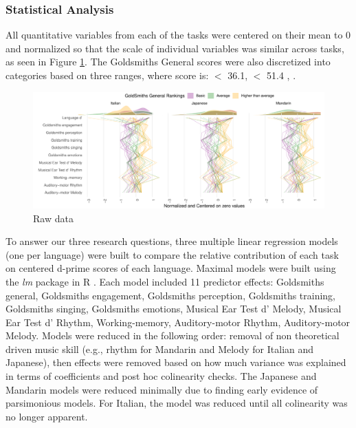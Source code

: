 \documentclass[a4paper]{article}
\begin{document}
\subsubsection{Statistical Analysis}


All quantitative variables from each of the tasks were centered on their mean to 0 and normalized so that the scale of individual variables was similar across tasks, as seen in Figure \ref{fig:centered_data}. The Goldsmiths General scores were also discretized into categories based on three ranges, where score is:  $<$ 36.1, \quad {} $<$ 51.4  , \quad {}  \cite{Müllensiefen_Gingras_Musil_Stewart_2014}. 

\begin{figure}[t]
  \centering
  \includegraphics[width=.9\textwidth]{SP_24_visuals/by_gs.pdf}
  \caption{Raw data}
  \label{fig:centered_data}
\end{figure}

To answer our three research questions, three multiple linear regression models (one per language) were built to compare the relative contribution of each task on centered d-prime scores of each language. Maximal models were built using the \textit{lm} package \cite{lmPackage} in R \cite{RManual}. Each model included 11 predictor effects: Goldsmiths general, Goldsmiths engagement, Goldsmiths perception, Goldsmiths training, Goldsmiths singing, Goldsmiths emotions, Musical Ear Test d' Melody, Musical Ear Test d' Rhythm, Working-memory, Auditory-motor Rhythm, Auditory-motor Melody. Models were reduced in the following order: removal of non theoretical driven music skill (e.g., rhythm for Mandarin and Melody for Italian and Japanese), then effects were removed based on how much variance was explained in terms of coefficients and post hoc colinearity checks. The Japanese and Mandarin models were reduced minimally due to finding early evidence of parsimonious models. For Italian, the model was reduced until all colinearity was no longer apparent. 
\end{document}
